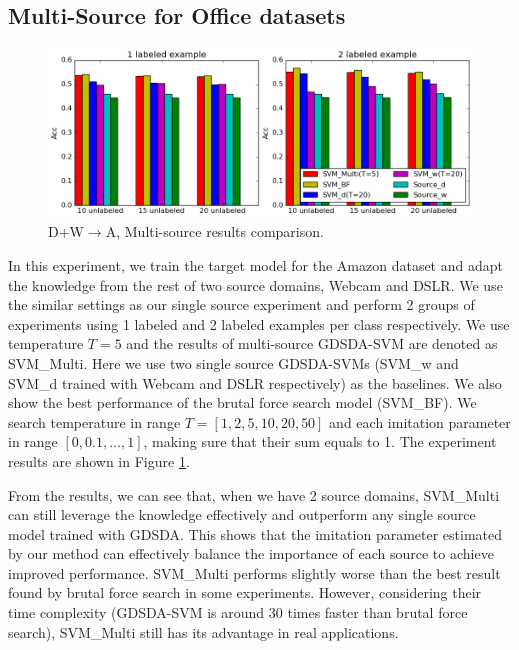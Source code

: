 \subsection{Multi-Source for Office datasets}
\begin{figure}
	\centering
	\includegraphics[scale=.25]{figure/cmp.png}
	\caption{D+W$\rightarrow$A, Multi-source results comparison.}\label{fig:multi}
\end{figure}
In this experiment, we train the target model for the Amazon dataset and adapt the knowledge from the rest of two source domains, Webcam and DSLR.
We use the similar settings as our single source experiment and perform 2 groups of experiments using 1 labeled and 2 labeled examples per class respectively. We use temperature $T=5$ and the results of multi-source GDSDA-SVM are denoted as SVM\_Multi. Here we use two single source GDSDA-SVMs (SVM\_w and SVM\_d trained with Webcam and DSLR respectively) as the baselines. We also show the best performance of the brutal force search model (SVM\_BF). We search temperature in range $T=[1,2,5,10,20,50]$ and each imitation parameter in range $[0,0.1,...,1]$, making sure that their sum equals to 1. The experiment results are shown in Figure \ref{fig:multi}.

From the results, we can see that, when we have 2 source domains, SVM\_Multi can still leverage the knowledge effectively and outperform any single source model trained with GDSDA. This shows that the imitation parameter estimated by our method can effectively balance the importance of each source to achieve improved performance. SVM\_Multi performs slightly worse than the best result found by brutal force search in some experiments. However, considering their time complexity (GDSDA-SVM is around 30 times faster than brutal force search), SVM\_Multi still has its advantage in real applications.




